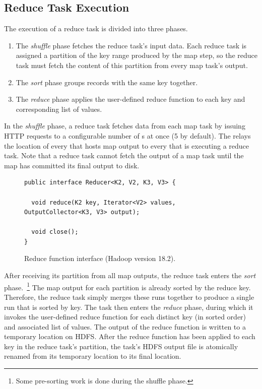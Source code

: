 \subsection{Reduce Task Execution}
\label{ch:hadoop:sec:reducetask}
The execution of a reduce task is divided into three phases.
\begin{enumerate}
    \ssp
\item The {\em shuffle} phase fetches the reduce task's input
  data. Each reduce task is assigned a partition of the key range
  produced by the map step, so the reduce task must fetch the content
  of this partition from every map task's output.
\item The {\em sort} phase groups records with the same key together.
\item The {\em reduce} phase applies the user-defined reduce function
  to each key and corresponding list of values.
\end{enumerate}

In the {\em shuffle} phase, a reduce task fetches data from each map task by
issuing HTTP requests to a configurable number of {\TT}s at once (5 by
default).  The {\JT} relays the location of every {\TT} that hosts map output
to every {\TT} that is executing a reduce task.  Note that a reduce task cannot
fetch the output of a map task until the map has committed its final output to
disk.

\begin{figure}[t]
\ssp
\begin{minipage}{\linewidth}
\begin{verbatim}
public interface Reducer<K2, V2, K3, V3> {

  void reduce(K2 key, Iterator<V2> values, OutputCollector<K3, V3> output);

  void close();
}
\end{verbatim}

\end{minipage}
\caption{Reduce function interface (Hadoop version 18.2).}
\label{fig:reducefunction}
\end{figure}

After receiving its partition from all map outputs, the reduce task enters the
{\em sort} phase.~\footnote{Some pre-sorting work is done during the shuffle
phase.}  The map output for each partition is already sorted by the reduce
key.  Therefore, the reduce task simply merges these runs together to produce a
single run that is sorted by key.  The task then enters the {\em reduce} phase,
during which it invokes the user-defined reduce function for each distinct key
(in sorted order) and associated list of values.  The output of the reduce
function is written to a temporary location on HDFS.  After the reduce function
has been applied to each key in the reduce task's partition, the task's HDFS
output file is atomically renamed from its temporary location to its final
location.

